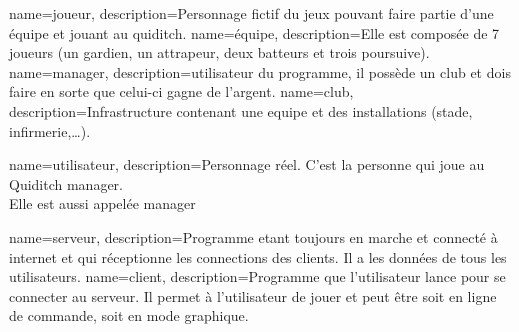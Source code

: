 {
    name=joueur,
    description={Personnage fictif du jeux pouvant faire partie d'une équipe et jouant au quiditch.}
}
{
    name=équipe,
    description={Elle est composée de 7 \glspl{joueur} (un gardien, un attrapeur, deux batteurs et trois poursuive).}
}
{
    name=manager,
    description={\Gls{utilisateur} du programme, il possède un \gls{club} et dois faire en sorte que celui-ci gagne de l'argent.}
}
{
    name=club,
    description={Infrastructure contenant une \gls{equipe} et des installations (stade, infirmerie,\ldots).}
}

{
    name=utilisateur,
    description={Personnage réel. C'est la personne qui joue au Quiditch manager.\\
    Elle est aussi appelée \gls{manager}}
}

{
    name=serveur,
    description={Programme etant toujours en marche et connecté à internet et qui réceptionne les connections des \glspl{client}. Il a les données de tous les \glspl{utilisateur}.}
}
{
    name=client,
    description={Programme que l'\gls{utilisateur} lance pour se connecter au \gls{serveur}. Il permet à l'\gls{utilisateur} de jouer et peut être soit en ligne de commande, soit en mode graphique.}
}


